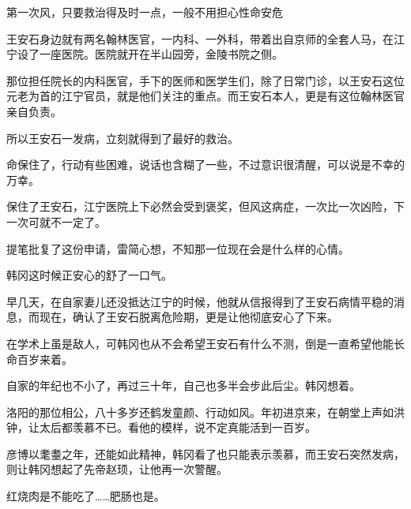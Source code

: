 第一次风，只要救治得及时一点，一般不用担心性命安危

王安石身边就有两名翰林医官，一内科、一外科，带着出自京师的全套人马，在江宁设了一座医院。医院就开在半山园旁，金陵书院之侧。

那位担任院长的内科医官，手下的医师和医学生们，除了日常门诊，以王安石这位元老为首的江宁官员，就是他们关注的重点。而王安石本人，更是有这位翰林医官亲自负责。

所以王安石一发病，立刻就得到了最好的救治。

命保住了，行动有些困难，说话也含糊了一些，不过意识很清醒，可以说是不幸的万幸。

保住了王安石，江宁医院上下必然会受到褒奖，但风这病症，一次比一次凶险，下一次可就不一定了。

提笔批复了这份申请，雷简心想，不知那一位现在会是什么样的心情。

韩冈这时候正安心的舒了一口气。

早几天，在自家妻儿还没抵达江宁的时候，他就从信报得到了王安石病情平稳的消息，而现在，确认了王安石脱离危险期，更是让他彻底安心了下来。

在学术上虽是敌人，可韩冈也从不会希望王安石有什么不测，倒是一直希望他能长命百岁来着。

自家的年纪也不小了，再过三十年，自己也多半会步此后尘。韩冈想着。

洛阳的那位相公，八十多岁还鹤发童颜、行动如风。年初进京来，在朝堂上声如洪钟，让太后都羡慕不已。看他的模样，说不定真能活到一百岁。

彦博以耄耋之年，还能如此精神，韩冈看了也只能表示羡慕，而王安石突然发病，则让韩冈想起了先帝赵顼，让他再一次警醒。

红烧肉是不能吃了……肥肠也是。
